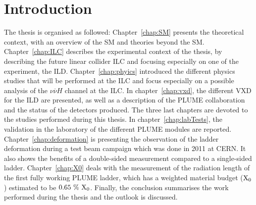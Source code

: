 \chapter{Introduction}

The thesis is organised as followed:
Chapter~\ref{chap:SM} presents the theoretical context, with an overview of the \gls{SM} and theories beyond the \gls{SM}.
Chapter~\ref{chap:ILC} describes the experimental context of the thesis, by describing the future linear collider \gls{ILC} and focusing especially on one of the experiment, the \gls{ILD}.
Chapter~\ref{chap:phyics} introduced the different physics studies that will be performed at the \gls{ILC} and focus especially on a possible analysis of the $\nu\overline{\nu}H$ channel at the \gls{ILC}.
In chapter~\ref{chap:vxd}, the different \gls{VXD} for the \gls{ILD} are presented, as well as a description of the \gls{PLUME} collaboration and the status of the detectors produced.
The three last chapters are devoted to the studies performed during this thesis.
In chapter~\ref{chap:labTests}, the validation in the laboratory of the different \gls{PLUME} modules are reported.
Chapter~\ref{chap:deformation} is presenting the observation of the ladder deformation during a test beam campaign which was done in 2011 at CERN. 
It also shows the benefits of a double-sided measurement compared to a single-sided ladder.
Chapter~\ref{chap:X0} deals with the measurement of the radiation length of the first fully working \gls{PLUME} ladder, which has a weighted material budget ($\rm{X_0}$) estimated to be $0.65~\%~\rm{X_0}$.
Finally, the conclusion summarises the work performed during the thesis and the outlook is discussed.
